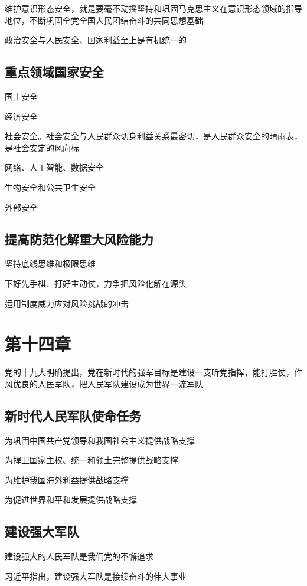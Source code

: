 \documentclass[11pt, a4paper]{article}
\begin{document}
维护意识形态安全，就是要毫不动摇坚持和巩固马克思主义在意识形态领域的指导地位，不断巩固全党全国人民团结奋斗的共同思想基础

政治安全与人民安全、国家利益至上是有机统一的

\subsection*{重点领域国家安全}

国土安全

经济安全

社会安全。社会安全与人民群众切身利益关系最密切，是人民群众安全的晴雨表，是社会安定的风向标

网络、人工智能、数据安全

生物安全和公共卫生安全

外部安全

\subsection*{提高防范化解重大风险能力}

坚持底线思维和极限思维

下好先手棋、打好主动仗，力争把风险化解在源头

运用制度威力应对风险挑战的冲击

\section*{第十四章}

党的十九大明确提出，党在新时代的强军目标是建设一支听党指挥，能打胜仗，作风优良的人民军队，把人民军队建设成为世界一流军队

\subsection*{新时代人民军队使命任务}

为巩固中国共产党领导和我国社会主义提供战略支撑

为捍卫国家主权、统一和领土完整提供战略支撑

为维护我国海外利益提供战略支撑

为促进世界和平和发展提供战略支撑

\subsection*{建设强大军队}

建设强大的人民军队是我们党的不懈追求

习近平指出，建设强大军队是接续奋斗的伟大事业
\end{document}
